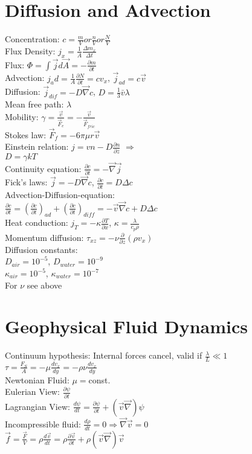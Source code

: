\section*{Diffusion and Advection}
Concentration: $c=\frac{m}{V} or \frac{n}{V} or \frac{N}{V}$\\
Flux Density: $j_x=\frac{1}{A}\frac{\Delta m_x}{\Delta t}$\\
Flux: $\Phi=\int\vec{j}d\vec{A}=-\frac{\partial m}{\partial t}$\\
Advection: $j_ad = \frac{1}{A}\frac{\partial N}{\partial t}=cv_x$, $\vec{j}_{ad}=c\vec{v}$\\
Diffusion: $\vec{j}_{dif}=-D\vec{\nabla} c$, $D=\frac{1}{3}\bar{v}\lambda$\\
Mean free path: $\lambda$\\
Mobility: $\gamma = \frac{\vec{v}}{\vec{F}_e}=-\frac{\vec{v}}{\vec{F}_{fric}}$\\
Stokes law: $\vec{F}_f=-6\pi\mu r\vec{v}$\\
Einstein relation: $j=vn-D\frac{\partial n}{\partial z}$ $\Rightarrow$\\ $D=\gamma kT$\\
Continuity equation: $\frac{\partial c}{\partial t}=-\vec{\nabla}\vec{j}$\\
Fick's laws: $\vec{j}=-D\vec{\nabla}c$, $\frac{\partial c}{\partial t} = D\Delta c$\\
Advection-Diffusion-equation:\\
$\frac{\partial c}{\partial t}=\left(\frac{\partial c}{\partial t}\right)_{ad}+\left(\frac{\partial c}{\partial t}\right)_{diff}=-\vec{v}\vec{\nabla}c+D\Delta c$\\
Heat conduction: $j_T = -\kappa\frac{\partial T}{\partial x}$, $\kappa = \frac{\lambda}{c_p\rho}$\\
Momentum diffusion: $\tau_{xz}=-\nu\frac{\partial}{\partial z}(\rho v_x)$\\
Diffusion constants:\\
$D_{air}=10^{-5}$, $D_{water}=10^{-9}$\\
$\kappa_{air}=10^{-5}$, $\kappa_{water}=10^{-7}$\\
For $\nu$ see above
\section*{Geophysical Fluid Dynamics}
Continuum hypothesis: Internal forces cancel, valid if $\frac{\lambda}{L}\ll 1$\\
$\tau=\frac{F_S}{A}=-\mu\frac{dv_x}{dy}=-\rho\nu\frac{dv_x}{dy}$\\
Newtonian Fluid: $\mu=$const.\\
Eulerian View: $\frac{\partial\psi}{\partial t}$\\
Lagrangian View: $\frac{d\psi}{dt}=\frac{\partial\psi}{\partial t} + (\vec{v}\vec{\nabla})\psi$\\
Incompressible fluid: $\frac{d\rho}{dt}=0 \Rightarrow \vec{\nabla}\vec{v}=0$\\
$\vec{f}=\frac{\vec{F}}{V}=\rho \frac{d\vec{v}}{dt}=\rho\frac{\partial\vec{v}}{\partial t}+\rho(\vec{v}\vec{\nabla})\vec{v}$
